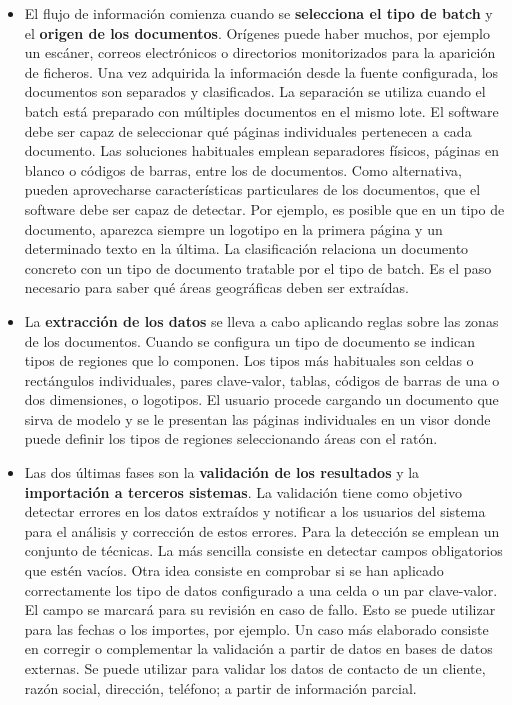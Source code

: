 \begin{itemize}
    \item El flujo de información comienza cuando se \textbf{selecciona el tipo de batch} y el \textbf{origen de los documentos}. Orígenes puede haber muchos, por ejemplo un escáner, correos electrónicos o directorios monitorizados para la aparición de ficheros. Una vez adquirida la información desde la fuente configurada, los documentos son separados y clasificados. La separación se utiliza cuando el batch está preparado con múltiples documentos en el mismo lote. El software debe ser capaz de seleccionar qué páginas individuales pertenecen a cada documento. Las soluciones habituales emplean separadores físicos, páginas en blanco o códigos de barras, entre los de documentos. Como alternativa, pueden aprovecharse características particulares de los documentos, que el software debe ser capaz de detectar. Por ejemplo, es posible que en un tipo de documento, aparezca siempre un logotipo en la primera página y un determinado texto en la última. La clasificación relaciona un documento concreto con un tipo de documento tratable por el tipo de batch. Es el paso necesario para saber qué áreas geográficas deben ser extraídas.
    
    \item La \textbf{extracción de los datos} se lleva a cabo aplicando reglas sobre las zonas de los documentos. Cuando se configura un tipo de documento se indican tipos de regiones que lo componen. Los tipos más habituales son celdas o rectángulos individuales, pares clave-valor, tablas, códigos de barras de una o dos dimensiones, o logotipos. El usuario procede cargando un documento que sirva de modelo y se le presentan las páginas individuales en un visor donde puede definir los tipos de regiones seleccionando áreas con el ratón.
    
    \item Las dos últimas fases son la \textbf{validación de los resultados} y la \textbf{importación a terceros sistemas}. La validación tiene como objetivo detectar errores en los datos extraídos y notificar a los usuarios del sistema para el análisis y corrección de estos errores. Para la detección se emplean un conjunto de técnicas. La más sencilla consiste en detectar campos obligatorios que estén vacíos. Otra idea consiste en comprobar si se han aplicado correctamente los tipo de datos configurado a una celda o un par clave-valor. El campo se marcará para su revisión en caso de fallo. Esto se puede utilizar para las fechas o los importes, por ejemplo. Un caso más elaborado consiste en corregir o complementar la validación a partir de datos en bases de datos externas. Se puede utilizar para validar los datos de contacto de un cliente, razón social, dirección, teléfono; a partir de información parcial.
    

\end{itemize}
